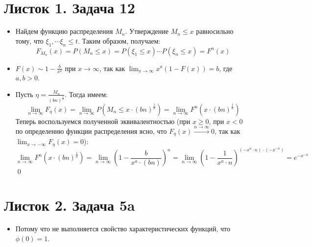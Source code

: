 



\section{Листок 1. Задача 12}

\begin{itemize}
\item Найдем функцию распределения $M_n$. Утверждение $M_n \leq x$ равносильно тому, что $\xi_1, \cdots \xi_n \leq t$.
Таким образом, получаем: 
\[
    F_{M_n}\left(x\right) = P\left(M_n \leq x\right) = P\left(\xi_1 \leq x\right) \cdots P\left(\xi_n \leq x\right) = F^n\left(x\right)
\]
\item $F\left(x\right) \sim 1 - \frac{b}{x ^ a}$ при $x \to \infty$, так как $\lim_{x \to \infty}x ^ a \left(1 - F\left(x\right)\right) = b$, где $a, b > 0$.
\item Пусть $\eta = \frac{M_n}{\left(bn\right) ^ \frac1a}$. Тогда имеем: 
\[
    \lim_{n \to \infty} F_{\eta}\left(x\right) = \lim_{n \to \infty} P\left(M_n \leq x \cdot \left(bn\right) ^ \frac1a\right) = \lim_{n \to \infty} F ^ n\left(x \cdot \left(bn\right) ^ \frac1a\right)
\]
Теперь воспользуемся полученной эквивалентностью (при $x \geq 0$, при $x < 0$ по определению функции распределения ясно, что $F_{\eta}\left(x\right) \xrightarrow{n \to \infty} 0$, так как $\lim_{x \to -\infty} F_{\eta}\left(x\right) = 0$):
\[
    \lim_{n \to \infty} F ^ n\left(x \cdot \left(bn\right) ^ \frac1a\right) = \lim_{n \to \infty} \left(1 - \frac{b}{x ^ a \cdot \left(bn\right)}\right) ^ n = \lim_{n \to \infty} \left(1 - \frac{1}{x ^ a \cdot n}\right) ^ {\left(-x ^ a \cdot n \right) \cdot \left(-x ^ {-a}\right)} = e ^ {-x ^ {-a}}
\]
\qed
\end{itemize}

\section{Листок 2. Задача 5a}
\begin{itemize}
\item Потому что не выполняется свойство характеристических функций, что $\phi\left(0\right) = 1$.
\end{itemize}

